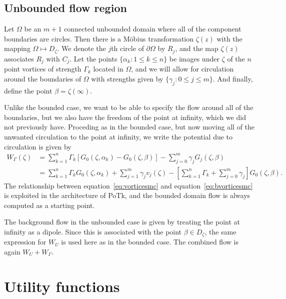 \documentclass[12pt,fleqn]{article}
\begin{document}
\subsection{Unbounded flow region}
Let $\Omega$ be an $m+1$ connected unbounded domain where all of the component boundaries are circles. Then there is a M\"obius transformation $\zeta(z)$ with the mapping $\Omega\mapsto D_\zeta$. We denote the $j$th circle of $\partial\Omega$ by $R_j$, and the map $\zeta(z)$ associates $R_j$ with $C_j$. Let the points $\{\alpha_k:1\le k\le n\}$ be images under $\zeta$ of the $n$ point vortices of strength $\Gamma_k$ located in $\Omega$, and we will allow for circulation around the boundaries of $\Omega$ with strengths given by $\{\gamma_j:0\le j\le m\}$. And finally, define the point $\beta = \zeta(\infty)$.

Unlike the bounded case, we want to be able to specify the flow around all of the boundaries, but we also have the freedom of the point at infinity, which we did not previously have. Proceding as in the bounded case, but now moving all of the unwanted circulation to the point at infinity, we write the potential due to circulation is given by
\begin{equation}
  \begin{split}
    W_\Gamma(\zeta) &= \sum_{k=1}^n \Gamma_k \left[ G_0(\zeta,\alpha_k) - G_0(\zeta,\beta) \right] - \sum_{j=0}^m \gamma_j G_j(\zeta,\beta) \\
    &= \sum_{k=1}^n \Gamma_k G_0(\zeta,\alpha_k) + \sum_{j=1}^m \gamma_j v_j(\zeta) - \left[ \sum_{k=1}^n \Gamma_k + \sum_{j=0}^m \gamma_j \right] G_0(\zeta,\beta).
  \end{split}
  \label{eq:vorticesmc}
\end{equation}
The relationship between equation~\eqref{eq:vorticesmc} and equation~\eqref{eq:bvorticesmc} is exploited in the architecture of PoTk, and the bounded domain flow is always computed as a starting point.

The background flow in the unbounded case is given by treating the point at infinity as a dipole. Since this is associated with the point $\beta\in D_\zeta$, the same expression for $W_U$ is used here as in the bounded case. The combined flow is again $W_U + W_\Gamma$.




\clearpage
\appendix

\section{Utility functions}
\end{document}
